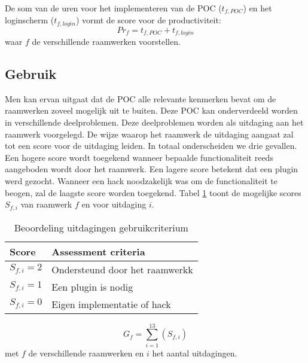 \paragraph{}
De som van de uren voor het implementeren van de POC ($t_{f,POC}$) en het loginscherm ($t_{f,login}$) vormt de score voor de productiviteit:
\begin{equation}
  Pr_f = {t_{f,POC} + t_{f,login}}
  \label{eq:productiviteit}
\end{equation}
waar $f$ de verschillende raamwerken voorstellen.

\subsection{Gebruik}
\label{sec:vergelijking-gebruik}
Men kan ervan uitgaat dat de POC alle relevante kenmerken bevat om de raamwerken zoveel mogelijk uit te buiten. 
Deze POC kan onderverdeeld worden in verschillende deelproblemen.
Deze deelproblemen worden als uitdaging aan het raamwerk voorgelegd.
De wijze waarop het raamwerk de uitdaging aangaat zal tot een score voor de uitdaging leiden.
In totaal onderscheiden we drie gevallen.
Een hogere score wordt toegekend wanneer bepaalde functionaliteit reeds aangeboden wordt door het raamwerk. 
Een lagere score betekent dat een plugin werd gezocht. 
Wanneer een hack noodzakelijk was om de functionaliteit te beogen, zal de laagste score worden toegekend.
Tabel \ref{tabel:scores-uitdagingen} toont de mogelijke scores $S_{f,i}$ van raamwerk $f$ en voor uitdaging $i$.
\begin{table}[h]	
  \centering
  \begin{tabular}{ll}
    \toprule
    \textbf{Score} & \textbf{Assessment criteria}\\
    \midrule
    $S_{f,i} = 2$ & Ondersteund door het raamwerkk\\
    $S_{f,i} = 1$ & Een plugin is nodig\\
    $S_{f,i} = 0$ & Eigen implementatie of hack\\
    \bottomrule
  \end{tabular}
  \caption{Beoordeling uitdagingen gebruikcriterium}
  \label{tabel:scores-uitdagingen}
\end{table}
\begin{equation}
  G_f = \sum_{i=1}^{13}{\left(S_{f,i}\right)}
  \label{eq:gebruik}
\end{equation}
met $f$ de verschillende raamwerken en $i$ het aantal uitdagingen.

